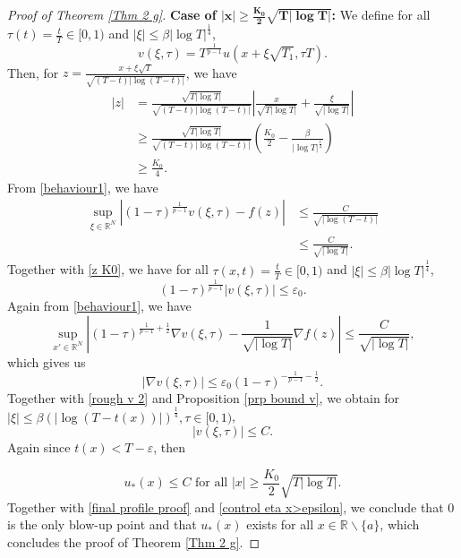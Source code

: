 \documentclass[10pt,a4paper]{amsart}
\newcommand{\R}{\numberset{R}}
\newcommand{\numberset}{\mathbb}
\begin{document}
\begin{proof}[Proof of Theorem \ref{Thm 2 g}]
\textbf{Case of $\mathbf{|x| \geq \frac{K_0}{2}\sqrt{T|\log T|}}$:} We define for all $\tau(t)=\frac{t}{T}\in [0,1)$ and $|\xi|\leq \beta |\log T|^{\frac{1}{4}}$,
$$v(\xi,\tau)=T^{\frac{1}{p-1}}u(x+\xi\sqrt{T_1},\tau T).$$
Then, for $z=\frac{x+\xi\sqrt{T}}{\sqrt{(T-t)|\log(T-t)|}}$, we have
\begin{equation}\label{z K0}
\begin{split}
|z|&=\frac{\sqrt{T|\log T|}}{\sqrt{(T-t)|\log(T-t)|}}\left|\frac{x}{\sqrt{T|\log T|}}+\frac{\xi}{\sqrt{|\log T|}}\right|\\
&\geq \frac{\sqrt{T|\log T|}}{\sqrt{(T-t)|\log(T-t)|}}\left(\frac{K_0}{2}-\frac{\beta}{|\log T|^{\frac{1}{4}}}\right)\\
&\geq \frac{K_0}{4}.
\end{split}
\end{equation}
From \eqref{behaviour1}, we have
\begin{equation*}
\begin{split}
\underset{\xi\in \R^N}{\sup}\left|(1-\tau)^{\frac{1}{p-1}}v(\xi,\tau)-f\left(z\right)\right|&\leq \frac{C}{\sqrt{|\log(T-t)|}}\\
&\leq \frac{C}{\sqrt{|\log T|}}.
\end{split}
\end{equation*}
Together with \eqref{z K0}, we have for all $\tau(x,t)=\frac{t}{T}\in [0,1)$ and $|\xi|\leq \beta |\log T|^{\frac{1}{4}}$,
\begin{equation}\label{rough v 2}
(1-\tau)^{\frac{1}{p-1}}|v(\xi,\tau)|\leq \varepsilon_0.
\end{equation}
Again from \eqref{behaviour1}, we have
\begin{equation*}
\underset{x'\in \R^N}{\sup}\left|(1-\tau)^{\frac{1}{p-1}+\frac{1}{2}}\nabla v(\xi,\tau)-\frac{1}{\sqrt{|\log T|}}\nabla f\left(z\right)\right|\leq \frac{C}{\sqrt{|\log T|}},
\end{equation*}
which gives us 
\begin{equation*}
|\nabla v(\xi,\tau)|\leq \varepsilon_0 (1-\tau)^{-\frac{1}{p-1}-\frac{1}{2}}.
\end{equation*}
Together with \eqref{rough v 2} and Proposition \ref{prp bound v}, we obtain for $|\xi|\leq\beta (|\log(T-t(x))|)^{\frac{1}{4}},\tau\in[0,1)$, 
$$|v(\xi,\tau)|\leq C.$$
Again since $t(x)<T-\varepsilon$, then 

$$u_*(x)\leq C \text{ for all }|x| \geq \frac{K_0}{2}\sqrt{T|\log T|}.$$
Together with \eqref{final profile proof} and \eqref{control eta x>epsilon}, we conclude that $0$ is the only blow-up point and that $u_*(x)$ exists for all $x\in \R\backslash \{a\}$, which concludes the proof of Theorem \ref{Thm 2 g}.
\end{proof}
\end{document}
